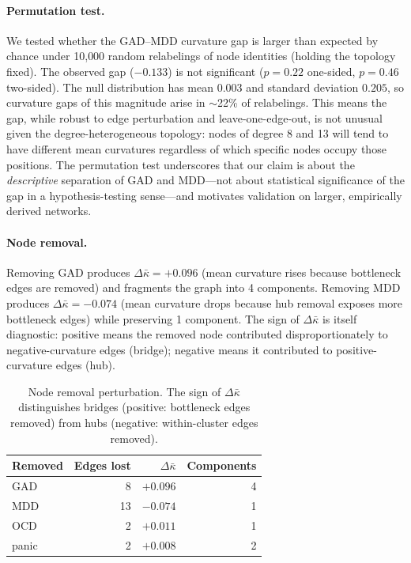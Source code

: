 \documentclass{article}
\begin{document}
\paragraph{Permutation test.} We tested whether the GAD--MDD curvature gap is larger than expected by chance under 10{,}000 random relabelings of node identities (holding the topology fixed). The observed gap ($-0.133$) is not significant ($p = 0.22$ one-sided, $p = 0.46$ two-sided). The null distribution has mean $0.003$ and standard deviation $0.205$, so curvature gaps of this magnitude arise in $\sim$22\% of relabelings. This means the gap, while robust to edge perturbation and leave-one-edge-out, is not unusual given the degree-heterogeneous topology: nodes of degree 8 and 13 will tend to have different mean curvatures regardless of which specific nodes occupy those positions. The permutation test underscores that our claim is about the \emph{descriptive} separation of GAD and MDD---not about statistical significance of the gap in a hypothesis-testing sense---and motivates validation on larger, empirically derived networks.

\paragraph{Node removal.} Removing GAD produces $\Delta\bar\kappa = +0.096$ (mean curvature rises because bottleneck edges are removed) and fragments the graph into 4 components. Removing MDD produces $\Delta\bar\kappa = -0.074$ (mean curvature drops because hub removal exposes more bottleneck edges) while preserving 1 component. The sign of $\Delta\bar\kappa$ is itself diagnostic: positive means the removed node contributed disproportionately to negative-curvature edges (bridge); negative means it contributed to positive-curvature edges (hub).

\begin{table}[t]
\centering
\caption{Node removal perturbation. The sign of $\Delta\bar\kappa$ distinguishes bridges (positive: bottleneck edges removed) from hubs (negative: within-cluster edges removed).}
\label{tab:removal}
\begin{tabular}{lrrr}
\toprule
Removed & Edges lost & $\Delta\bar\kappa$ & Components \\
\midrule
GAD   &  8 & $+0.096$ & 4 \\
MDD   & 13 & $-0.074$ & 1 \\
OCD   &  2 & $+0.011$ & 1 \\
panic &  2 & $+0.008$ & 2 \\
\bottomrule
\end{tabular}
\end{table}
\end{document}
